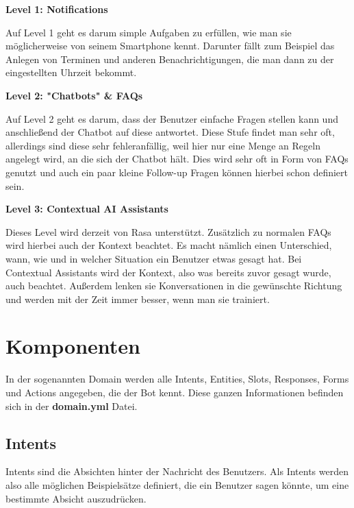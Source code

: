 \textbf{Level 1: Notifications}

Auf Level 1 geht es darum simple Aufgaben zu erfüllen, wie man sie möglicherweise von seinem Smartphone kennt.
Darunter fällt zum Beispiel das Anlegen von Terminen und anderen Benachrichtigungen, die man dann zu der eingestellten Uhrzeit bekommt.\cite{rasaMasterclass5Levels,ai5Levels,ai5LevelsVideo}

\textbf{Level 2: "Chatbots" \& FAQs}

Auf Level 2 geht es darum, dass der Benutzer einfache Fragen stellen kann und anschließend der Chatbot auf diese antwortet.
Diese Stufe findet man sehr oft, allerdings sind diese sehr fehleranfällig, weil hier nur eine Menge an Regeln angelegt wird, an die sich der Chatbot hält.
Dies wird sehr oft in Form von FAQs genutzt und auch ein paar kleine Follow-up Fragen können hierbei schon definiert sein.\cite{rasaMasterclass5Levels,ai5Levels,ai5LevelsVideo}

\textbf{Level 3: Contextual AI Assistants}

Dieses Level wird derzeit von Rasa unterstützt.
Zusätzlich zu normalen FAQs wird hierbei auch der Kontext beachtet.
Es macht nämlich einen Unterschied, wann, wie und in welcher Situation ein Benutzer etwas gesagt hat.
Bei Contextual Assistants wird der Kontext, also was bereits zuvor gesagt wurde, auch beachtet.
Außerdem lenken sie Konversationen in die gewünschte Richtung und werden mit der Zeit immer besser, wenn man sie trainiert.\cite{rasaMasterclass5Levels,ai5Levels,ai5LevelsVideo}

\section{Komponenten}

In der sogenannten Domain werden alle Intents, Entities, Slots, Responses, Forms und Actions angegeben, die der Bot kennt.
Diese ganzen Informationen befinden sich in der \textbf{domain.yml} Datei.\cite{domain}

\subsection{Intents}

Intents sind die Absichten hinter der Nachricht des Benutzers.
Als Intents werden also alle möglichen Beispielsätze definiert, die ein Benutzer sagen könnte, um eine bestimmte Absicht auszudrücken.\cite{intents}


